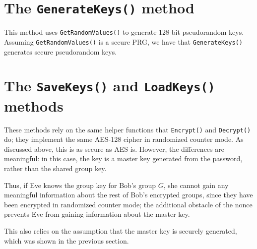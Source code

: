 \documentclass{amsart}
\begin{document}
\section{The \texttt{GenerateKeys()} method}%
This method uses \verb+GetRandomValues()+ to generate 128-bit pseudorandom keys. Assuming \verb+GetRandomValues()+ is a secure PRG, we have that \texttt{GenerateKeys()} generates secure pseudorandom keys.

\section{The \texttt{SaveKeys()} and \texttt{LoadKeys()} methods}%
These methods rely on the same helper functions that \verb+Encrypt()+ and \verb+Decrypt()+ do; they implement the same AES-128 cipher in randomized counter mode. As discussed above, this is as secure as AES is. However, the differences are meaningful: in this case, the key is a master key generated from the password, rather than the shared group key.

Thus, if Eve knows the group key for Bob's group $G$, she cannot gain any meaningful information about the rest of Bob's encrypted groups, since they have been encrypted in randomized counter mode; the additional obstacle of the nonce prevents Eve from gaining information about the master key.

This also relies on the assumption that the master key is securely generated, which was shown in the previous section.%

\end{document}
